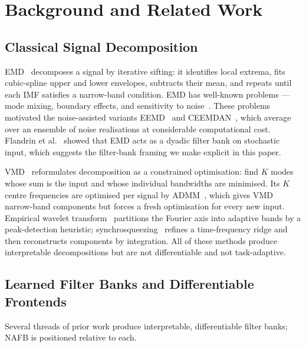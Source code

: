 \documentclass[journal]{IEEEtran}
\theoremstyle{remark}
\begin{document}
\section{Background and Related Work}
\label{sec:related}

\subsection{Classical Signal Decomposition}

EMD~\cite{huang1998emd} decomposes a signal by iterative sifting: it
identifies local extrema, fits cubic-spline upper and lower envelopes,
subtracts their mean, and repeats until each IMF satisfies a
narrow-band condition. EMD has well-known problems --- mode mixing,
boundary effects, and sensitivity to noise~\cite{rilling2003emd}.
These problems motivated the noise-assisted variants EEMD~\cite{wu2009eemd}
and CEEMDAN~\cite{torres2011ceemdan}, which average over an ensemble
of noise realisations at considerable computational cost. Flandrin et
al.~\cite{flandrin2004emdfilterbank} showed that EMD acts as a
dyadic filter bank on stochastic input, which suggests the
filter-bank framing we make explicit in this paper.

VMD~\cite{dragomiretskiy2014vmd} reformulates decomposition as a
constrained optimisation: find $K$ modes whose sum is the input and
whose individual bandwidths are minimised. Its $K$ centre frequencies
are optimised per signal by ADMM~\cite{boyd2011admm}, which gives VMD
narrow-band components but forces a fresh optimisation for every new
input. Empirical wavelet transform~\cite{gilles2013ewt} partitions the
Fourier axis into adaptive bands by a peak-detection heuristic;
synchrosqueezing~\cite{daubechies2011synchrosqueezing} refines a
time-frequency ridge and then reconstructs components by integration.
All of these methods produce interpretable decompositions but are not
differentiable and not task-adaptive.

\subsection{Learned Filter Banks and Differentiable Frontends}

Several threads of prior work produce interpretable, differentiable
filter banks; NAFB is positioned relative to each.
\end{document}
